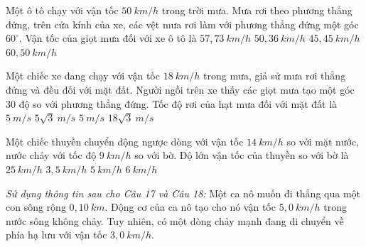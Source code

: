 \begin{ex}%
Một ô tô chạy với vận tốc $50\ km/h$ trong trời mưa. Mưa rơi theo phương thẳng đứng, trên cửa kính của xe, các vệt mưa rơi làm với phương thẳng đứng một góc $60^\circ$. Vận tốc của giọt mưa đối với xe ô tô là
\choice
{\True $57,73 \ km/h$}
{$50,36 \ km/h$}
{$45,45 \ km/h$}
{$60,50 \ km/h$}
\loigiai{

}
\end{ex}
\begin{ex}%
Một chiếc xe đang chạy với vận tốc $18 \ km/h$ trong mưa, giả sử mưa rơi thẳng đứng và đều đối với mặt đất. Người ngồi trên xe thấy các giọt mưa tạo một góc $30$ độ so với phương thẳng đứng. Tốc độ rơi của hạt mưa đối với mặt đất là
\choice
{$5 \ m/s$}
{\True $5 \sqrt{3} \ m/s$}
{$5 \ m/s$}
{$18 \sqrt{3} \ m/s$}

\loigiai{

}
\end{ex}
\begin{ex}%
Một chiếc thuyền chuyển động ngược dòng với vận tốc $14 \ km/h$ so với mặt nước, nước chảy với tốc độ $9 \ km/h$ so với bờ. Độ lớn vận tốc của thuyền so với bờ là
\choice
{$25 \ km/h$}
{$3,5 \ km/h$}
{\True $5 \ km/h$}
{$6 \ km/h$}
\loigiai{

}
\end{ex}





\textit{Sử dụng thông tin sau cho Câu 17 và Câu 18:} Một ca nô muốn đi thẳng qua một con sông rộng $0,10\ km$. Động cơ của ca nô tạo cho nó vận tốc $5,0\ km/h$ trong nước sông không chảy. Tuy nhiên, có một dòng chảy mạnh đang di chuyển về phía hạ lưu với vận tốc $3,0\ km/h$.

